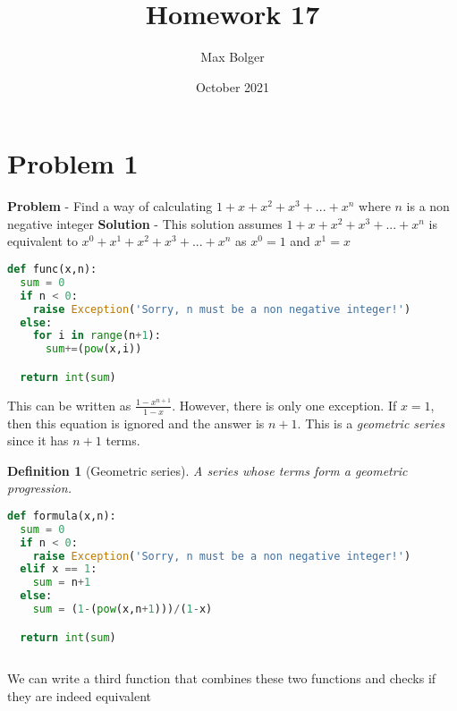 \documentclass{article}
\title{Homework 17}
\author{Max Bolger}
\date{October 2021}
\newtheorem{definition}{Definition}
\begin{document}
\maketitle

\section{Problem 1}

\textbf{Problem} - Find a way of calculating $1 + x + x^2 + x^3 + ... + x^n$ where $n$ is a non negative integer
\newline
\newline
\textbf{Solution} -  This solution assumes $1 + x + x^2 + x^3 + ... + x^n$ is equivalent to $x^0 + x^1 + x^2 + x^3 + ... + x^n$ as $x^0 = 1$ and $x^1 = x$

\begin{lstlisting}[language=Python, caption = This function uses a loop to solve the problem]
def func(x,n):
  sum = 0
  if n < 0:
    raise Exception('Sorry, n must be a non negative integer!')
  else:
    for i in range(n+1):
      sum+=(pow(x,i))

  return int(sum)
\end{lstlisting}
\newline
This can be written as $\frac{1 - x^{n+1}}{1-x}$. However, there is only one exception. If $x = 1$, then this equation is ignored and the answer is $n + 1$. This is a \textit{geometric series} since it has $n+1$ terms.

\begin{definition}[Geometric series]
A series whose terms form a geometric progression.
\end{definition}

\begin{lstlisting}[language=Python, caption = This function uses the mathematical formula to solve the problem]
def formula(x,n):
  sum = 0
  if n < 0:
    raise Exception('Sorry, n must be a non negative integer!')
  elif x == 1:
    sum = n+1
  else:
    sum = (1-(pow(x,n+1)))/(1-x)

  return int(sum)
 
\end{lstlisting}
\newline
We can write a third function that combines these two functions and checks if they are indeed equivalent

\pagebreak 
\end{document}
